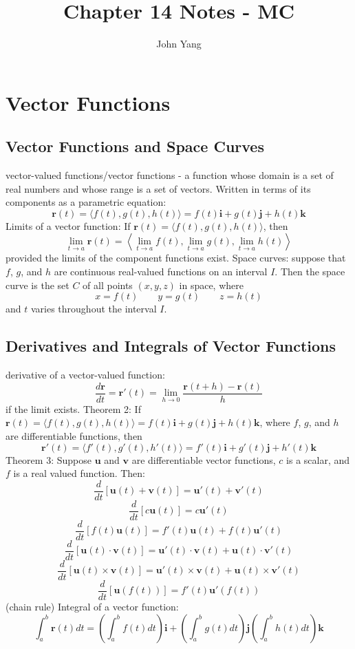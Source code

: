 \documentclass{article}
\title{Chapter 14 Notes - MC} %
\author{John Yang}
\begin{document}
    \maketitle
    \tableofcontents
    \section{Vector Functions} %
    \subsection{Vector Functions and Space Curves} %
    \begin{outline}
        \1 vector-valued functions/vector functions - a function whose domain is a set of real numbers and whose range is a set of vectors. Written in terms of its components as a parametric equation: \[\mathbf r(t)=\langle f(t),g(t),h(t)\rangle=f(t)\mathbf i+g(t)\mathbf j+h(t)\mathbf k\]
        \1 Limits of a vector function: If \(\mathbf r(t)=\langle f(t),g(t),h(t)\rangle\), then \[\lim_{t\to a}\mathbf r(t)=\left\langle\lim_{t\to a}f(t),\lim_{t\to a}g(t),\lim_{t\to a}h(t)\right\rangle\] provided the limits of the component functions exist. 
        \1 Space curves: suppose that $f$, $g$, and $h$ are continuous real-valued functions on an interval $I$. Then the space curve is the set $C$ of all points \((x,y,z)\) in space, where \[x=f(t)\qquad y=g(t)\qquad z=h(t)\] and $t$ varies throughout the interval $I$. 
    \end{outline}
    \subsection{Derivatives and Integrals of Vector Functions}
    \begin{outline}
        \1 derivative of a vector-valued function: \[\dfrac{d\mathbf r}{dt}=\mathbf r'(t)=\lim_{h\to 0}\dfrac{\mathbf r(t+h)-\mathbf r(t)}{h}\] if the limit exists. 
        \1 Theorem 2: If \(\mathbf r(t)=\langle f(t),g(t),h(t)\rangle=f(t)\mathbf i+g(t)\mathbf j+h(t)\mathbf k\), where $f$, $g$, and $h$ are differentiable functions, then \[\mathbf r'(t)=\langle f'(t),g'(t),h'(t)\rangle =f'(t)\mathbf i+g'(t)\mathbf j+h'(t)\mathbf k\]
        \1 Theorem 3: Suppose $\mathbf u$ and $\mathbf v$ are differentiable vector functions, $c$ is a scalar, and $f$ is a real valued function. Then: 
            \2 \[\dfrac{d}{dt}[\mathbf u(t)+\mathbf v(t)]=\mathbf u'(t)+\mathbf v'(t)\]
            \2 \[\dfrac{d}{dt}[c\mathbf u(t)]=c\mathbf u'(t)\]
            \2 \[\dfrac{d}{dt}[f(t)\mathbf u(t)]=f'(t)\mathbf u(t)+f(t)\mathbf u'(t)\]
            \2 \[\dfrac{d}{dt}[\mathbf u(t)\cdot\mathbf v(t)]=\mathbf u'(t)\cdot\mathbf v(t)+\mathbf u(t)\cdot\mathbf v'(t)\]
            \2 \[\dfrac{d}{dt}[\mathbf u(t)\times\mathbf v(t)]=\mathbf u'(t)\times\mathbf v(t)+\mathbf u(t)\times\mathbf v'(t)\]
            \2 \[\dfrac{d}{dt}[\mathbf u(f(t))]=f'(t)\mathbf u'(f(t))\] (chain rule)
        \1 Integral of a vector function: \[\int^b_a\mathbf r(t)dt=\left(\int^b_af(t)dt\right)\mathbf i+\left(\int^b_ag(t)dt\right)\mathbf j\left(\int^b_ah(t)dt\right)\mathbf k\]
        
    \end{outline}
\end{document}
